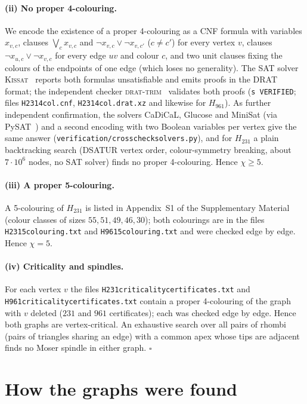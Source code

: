 \documentclass[11pt]{article}
\renewcommand{\_}{\textunderscore\allowbreak}
\theoremstyle{remark}
\begin{document}
\paragraph{(ii) No proper 4-colouring.} We encode the existence of a proper 4-colouring as a CNF formula
with variables $x_{v,c}$, clauses $\bigvee_{c}x_{v,c}$ and $\neg x_{v,c}\vee\neg x_{v,c'}$ ($c\ne c'$)
for every vertex $v$, clauses $\neg x_{u,c}\vee\neg x_{v,c}$ for every edge $uv$ and colour $c$, and two
unit clauses fixing the colours of the endpoints of one edge (which loses no generality). The SAT solver
\textsc{Kissat}~\cite{Kissat} reports both formulas unsatisfiable and emits proofs in the DRAT format;
the independent checker \textsc{drat-trim}~\cite{WetzlerHeuleHunt2014} validates both proofs
(\texttt{s VERIFIED}; files \texttt{H231\_4col.cnf}, \texttt{H231\_4col.drat.xz} and likewise for $H_{961}$). As further independent confirmation, the solvers CaDiCaL, Glucose and MiniSat (via
PySAT~\cite{PySAT}) and a second encoding with two Boolean variables per vertex give the same answer
(\texttt{verification/crosscheck\_solvers.py}), and
for $H_{231}$ a plain backtracking search (DSATUR vertex order, colour-symmetry breaking, about
$7\cdot10^{6}$ nodes, no SAT solver) finds no proper 4-colouring. Hence $\chi\ge5$.

\paragraph{(iii) A proper 5-colouring.} A 5-colouring of $H_{231}$ is listed in Appendix~S1 of the Supplementary Material
(colour classes of sizes $55,51,49,46,30$); both colourings are in the files \texttt{H231\_5colouring.txt} and
\texttt{H961\_5colouring.txt} and were checked edge by edge. Hence $\chi=5$.

\paragraph{(iv) Criticality and spindles.} For each vertex $v$ the files
\texttt{H231\_criticality\_certificates.txt} and \texttt{H961\_criticality\_certificates.txt} contain a
proper 4-colouring of the graph with $v$ deleted ($231$ and $961$ certificates); each was checked edge by
edge. Hence both graphs are vertex-critical. An exhaustive search over all pairs of rhombi (pairs of triangles sharing an edge)
with a common apex whose tips are adjacent finds no Moser spindle in either graph. \hfill$\square$

\section{How the graphs were found}\label{sec:method}
\end{document}
